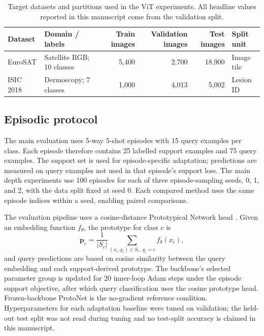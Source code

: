 \documentclass[11pt]{article}
\begin{document}
\begin{table}[t]
\centering
\small
\caption{Target datasets and partitions used in the ViT experiments. All headline values reported in this manuscript come from the validation split.}
\label{tab:datasets}
\begin{tabularx}{\textwidth}{lYrrrl}
\toprule
Dataset & Domain / labels & Train images & Validation images & Test images & Split unit\\
\midrule
EuroSAT & Satellite RGB; 10 classes & 5,400 & 2,700 & 18,900 & Image tile\\
ISIC 2018 & Dermoscopy; 7 classes & 1,000 & 4,013 & 5,002 & Lesion ID\\
\bottomrule
\end{tabularx}
\end{table}

\subsection{Episodic protocol}

The main evaluation uses 5-way 5-shot episodes with 15 query examples per class. Each episode therefore contains 25 labelled support examples and 75 query examples. The support set is used for episode-specific adaptation; predictions are measured on query examples not used in that episode's support loss. The main depth experiments use 100 episodes for each of three episode-sampling seeds, 0, 1, and 2, with the data split fixed at seed 0. Each compared method uses the same episode indices within a seed, enabling paired comparisons.

The evaluation pipeline uses a cosine-distance Prototypical Network head \cite{snell2017}. Given an embedding function $f_\theta$, the prototype for class $c$ is
\begin{equation}
 \mathbf{p}_c=\frac{1}{|S_c|}\sum_{(x_i,y_i)\in S_c,\,y_i=c} f_\theta(x_i),
\end{equation}
and query predictions are based on cosine similarity between the query embedding and each support-derived prototype. The backbone's selected parameter group is updated for 20 inner-loop Adam steps under the episode support objective, after which query classification uses the cosine prototype head. Frozen-backbone ProtoNet is the no-gradient reference condition. Hyperparameters for each adaptation baseline were tuned on validation; the held-out test split was not read during tuning and no test-split accuracy is claimed in this manuscript.
\end{document}
